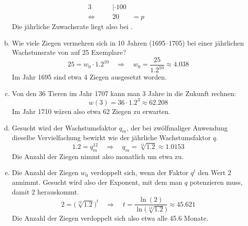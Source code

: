 \begin{exercise}
\begin{enumerate}[a)]
\begin{alignat*}{3}
              &
              \quad&|\cdot100
              \\[1ex]
              \Leftrightarrow&\quad
              &
              20&=p
              &
              \quad&\quad
            \end{alignat*}
            Die jährliche Zuwachsrate liegt also bei .
      \item Wie viele Ziegen vermehren sich in 10 Jahren
            (1695--1705) bei einer jährlichen Wachstunsrate von
             auf 25 Exemplare?
            \begin{equation*}
              25=w_0\cdot\num{1.2}^{10}
              \quad\Rightarrow\quad
              w_0=\frac{25}{\num{1.2}^{10}}
              \approx\num{4.038}
            \end{equation*}
            Im Jahr 1695 sind etwa 4 Ziegen ausgesetzt worden.
      \item Von den 36 Tieren im Jahr 1707 kann man 3 Jahre
            in die Zukunft rechnen:
            \begin{equation*}
              w(3)=36\cdot\num{1.2}^3\approx\num{62.208}
            \end{equation*}
            Im Jahr 1710 wären also etwa 62 Ziegen zu erwarten.
      \item Gesucht wird der Wachstumsfaktor $q_m$, der bei
            zwölfmaliger Anwendung dieselbe Vervielfachung
            bewirkt wie der jährliche Wachstumsfaktor $q$.
            \begin{equation*}
              \num{1.2}=q_m^{12}
              \quad\Rightarrow\quad
              q_m=\sqrt[12]{\num{1.2}}
              \approx\num{1.0153}
            \end{equation*}
            Die Anzahl der Ziegen nimmt also monatlich
            um etwa  zu.
      \item Die Anzahl der Ziegen $w_0$ verdoppelt sich, wenn
            der Faktor $q^t$ den Wert 2 annimmt.
            Gesucht wird also der Exponent, mit dem man $q$
            potenzieren muss, damit 2 herauskommt.
            \begin{equation*}
              2=\big(\sqrt[12]{\num{1.2}}\big)^t
              \quad\Rightarrow\quad
              t=\frac{\ln(2)}{\ln\big(\sqrt[12]{\num{1.2}}\big)}
              \approx\num{45.621}
            \end{equation*}
            Die Anzahl der Ziegen verdoppelt sich also etwa alle \num{45.6} Monate.
    \end{enumerate}
  \fi
\end{exercise}
